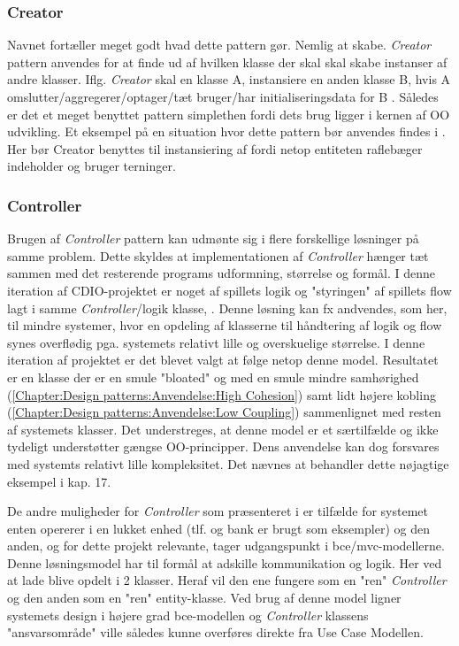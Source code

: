 \subsubsection{Creator}\label{Chapter:Design patterns:Anvendelse:Creator}
Navnet fortæller meget godt hvad dette pattern gør. Nemlig at skabe. \textit{Creator} pattern anvendes for at finde ud af hvilken klasse der skal skal skabe instanser af andre klasser. Iflg. \textit{Creator} skal en klasse A, instansiere en anden klasse B, hvis A omslutter/aggregerer/optager/tæt bruger/har initialiseringsdata for B \citep{umlbook}. Således er det et meget benyttet pattern simplethen fordi dets brug ligger i kernen af OO udvikling. Et eksempel på en situation hvor dette pattern bør anvendes findes i . Her bør Creator benyttes til instansiering af  fordi netop entiteten raflebæger indeholder og bruger terninger. 

\subsubsection{Controller}\label{Chapter:Design patterns:Anvendelse:Controller}
Brugen af \textit{Controller} pattern kan udmønte sig i flere forskellige løsninger på samme problem. Dette skyldes at implementationen af \textit{Controller} hænger tæt sammen med det resterende programs udformning, størrelse og formål. I denne iteration af CDIO-projektet er noget af spillets logik og "styringen" af spillets flow lagt i samme \textit{Controller}/logik klasse, . Denne løsning kan fx andvendes, som her, til mindre systemer, hvor en opdeling af klasserne til håndtering af logik og flow synes overflødig pga. systemets relativt lille og overskuelige størrelse. I denne iteration af projektet er det blevet valgt at følge netop denne model. Resultatet er en klasse  der er en smule "bloated" og med en smule mindre samhørighed (\vref{Chapter:Design patterns:Anvendelse:High Cohesion}) samt lidt højere kobling (\vref{Chapter:Design patterns:Anvendelse:Low Coupling}) sammenlignet med resten af systemets klasser. Det understreges, at denne model er et særtilfælde og ikke tydeligt understøtter gængse OO-principper. Dens anvendelse kan dog forsvares med systemts relativt lille kompleksitet. Det nævnes at \cite{umlbook} behandler dette nøjagtige eksempel i kap. 17.

De andre muligheder for \textit{Controller} som præsenteret i \cite{umlbook} er tilfælde for systemet enten opererer i en lukket enhed (tlf. og bank er brugt som eksempler) og den anden, og for dette projekt relevante, tager udgangspunkt i bce/mvc-modellerne. Denne løsningsmodel har til formål at adskille kommunikation og logik. Her ved at lade  blive opdelt i 2 klasser. Heraf vil den ene fungere som en "ren" \textit{Controller} og den anden som en "ren" entity-klasse. Ved brug af denne model ligner systemets design i højere grad bce-modellen og \textit{Controller} klassens "ansvarsområde"  ville således kunne overføres direkte fra Use Case Modellen.        




